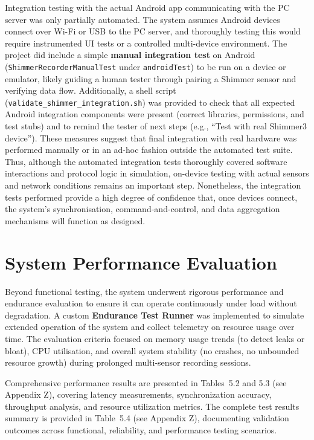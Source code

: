 Integration testing with the actual Android app communicating with the PC server was only partially automated. The system assumes Android devices connect over Wi-Fi or USB to the PC server, and thoroughly testing this would require instrumented UI tests or a controlled multi-device environment. The project did include a simple \textbf{manual integration test} on Android (\texttt{ShimmerRecorderManualTest} under \texttt{androidTest}) to be run on a device or emulator, likely guiding a human tester through pairing a Shimmer sensor and verifying data flow. Additionally, a shell script (\texttt{validate\_shimmer\_integration.sh}) was provided to check that all expected Android integration components were present (correct libraries, permissions, and test stubs) and to remind the tester of next steps (e.g., ``Test with real Shimmer3 device''). These measures suggest that final integration with real hardware was performed manually or in an ad-hoc fashion outside the automated test suite. Thus, although the automated integration tests thoroughly covered software interactions and protocol logic in simulation, on-device testing with actual sensors and network conditions remains an important step. Nonetheless, the integration tests performed provide a high degree of confidence that, once devices connect, the system's synchronisation, command-and-control, and data aggregation mechanisms will function as designed.

\section{System Performance Evaluation}
Beyond functional testing, the system underwent rigorous performance and endurance evaluation to ensure it can operate continuously under load without degradation. A custom \textbf{Endurance Test Runner} was implemented to simulate extended operation of the system and collect telemetry on resource usage over time. The evaluation criteria focused on memory usage trends (to detect leaks or bloat), CPU utilisation, and overall system stability (no crashes, no unbounded resource growth) during prolonged multi-sensor recording sessions.

Comprehensive performance results are presented in Tables~5.2 and 5.3 (see Appendix Z), covering latency measurements, synchronization accuracy, throughput analysis, and resource utilization metrics. The complete test results summary is provided in Table~5.4 (see Appendix Z), documenting validation outcomes across functional, reliability, and performance testing scenarios.

